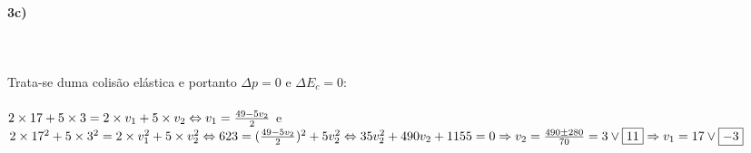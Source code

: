 \paragraph{3c)} ~\\
\\
Trata-se duma colisão elástica e portanto $\Delta p =0$ e $\Delta E_c=0$:\\
\\
$2 \times 17+5\times3=2\times v_1+5 \times v_2 \Leftrightarrow v_1=\frac{49-5v_2}{2}\\$
e\\
$2 \times 17^2+5\times 3^2=2 \times v_1^2+5 \times v_2^2 \Leftrightarrow 623=(\frac{49-5v_2}{2})^2+5v_2^2 \\
\\
\Leftrightarrow 35v^2_ 2+490v_ 2+1155=0\\
\\
\Rightarrow v_ 2=\frac{490\pm 280}{70}=3 \vee \boxed{11} \Rightarrow v_1=17 \vee \boxed{-3}$



